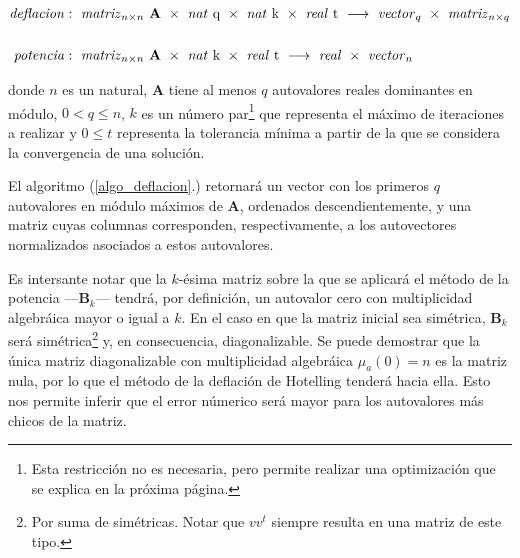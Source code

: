 \begin{align*}
    \text{\textit{deflacion}}&:\ \text{\textit{matriz}}_{n \times n}\ \mathbf{A}\ \times\ \text{\textit{nat} q}\ \times\ \text{\textit{nat} k}\ \times\ \text{\textit{real} t}\
    \longrightarrow\ \text{\textit{vector}}_q\ \times\ \text{\textit{matriz}}_{n \times q}
    \\ \\
    \text{\textit{potencia}}&:\ \text{\textit{matriz}}_{n \times n}\ \mathbf{A}\ \times\ \text{\textit{nat} k}\ \times\ \text{\textit{real} t}\ 
    \longrightarrow\ \text{\textit{real}}\ \times\ \text{\textit{vector}}_n
\end{align*}

\vspace{1em}
\noindent donde $n$ es un natural, \textbf{A} tiene al menos $q$ autovalores reales dominantes en módulo, $0 < q \leq n$, $k$ es un número par\footnote{Esta restricción no es necesaria, pero permite realizar una optimización que se explica en la próxima página.} que representa el máximo de iteraciones a realizar y $0 \leq t$ representa la tolerancia mínima a partir de la que se considera la convergencia de una solución. 

\vspace{1em}


\vspace{1em}
El algoritmo (\ref{algo_deflacion}.) retornará un vector con los primeros $q$ autovalores en módulo máximos de \textbf{A}, ordenados descendientemente, y una matriz cuyas columnas corresponden, respectivamente, a los autovectores normalizados asociados a estos autovalores. 

\vspace{1em}
Es intersante notar que la $k$-ésima matriz sobre la que se aplicará el método de la potencia ---\textbf{B}$_k$--- tendrá, por definición, un autovalor cero con multiplicidad algebráica mayor o igual a $k$. En el caso en que la matriz inicial sea simétrica, \textbf{B}$_k$ será simétrica\footnote{Por suma de simétricas. Notar que $v v^t$ siempre resulta en una matriz de este tipo.} y, en consecuencia, diagonalizable. Se puede demostrar que la única matriz diagonalizable con multiplicidad algebráica $\mu_{a}(0) = n$ es la matriz nula, por lo que el método de la deflación de Hotelling tenderá hacia ella. Esto nos permite inferir que el error númerico será mayor para los autovalores más chicos de la matriz.  


